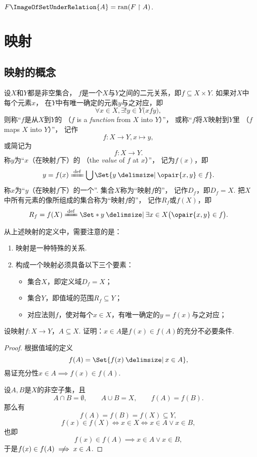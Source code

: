 \begin{theorem}
\(F\ImageOfSetUnderRelation{A} = \ran(F \upharpoonright A)\).
\end{theorem}


\section{映射}
\subsection{映射的概念}
\begin{definition}
设\(X\)和\(Y\)都是非空集合，
\(f\)是一个\(X\)与\(Y\)之间的二元关系，即\(f \subseteq X \times Y\).
如果对\(X\)中每个元素\(x\)，
在\(Y\)中有唯一确定的元素\(y\)与之对应，即\[
	\forall x \in X,
	\exists! y \in Y
	\bigl( x f y \bigr),
\]
则称“\(f\)是从\(X\)到\(Y\)的%
（\(f\) is a \emph{function} from \(X\) into \(Y\)）”，
或称“\(f\)将\(X\)映射到\(Y\)里%
（\(f\) maps \(X\) into \(Y\)）”，
记作\[
	f\colon X \to Y, x \mapsto y,
\]或简记为\[
	f\colon X \to Y.
\]
称\(y\)为“\(x\)（在映射\(f\)下）的%
（the \emph{value} of \(f\) at \(x\)）”，
记为\(f(x)\)，即\[
	y = f(x)
	\defeq \bigcup\Set{ y \given \opair{x,y} \in f }.
\]
称\(x\)为“\(y\)（在映射\(f\)下）的一个”.
集合\(X\)称为“映射\(f\)的”，
记作\(D_f\)，即\(D_f = X\).
把\(X\)中所有元素的像所组成的集合称为“映射\(f\)的”，
记作\(R_f\)或\(f(X)\)，即\[
	R_f = f(X)
	\defeq \Set*{ y \given \exists x \in X \bigl( \opair{x,y} \in f \bigr) }.
\]
\end{definition}

从上述映射的定义中，需要注意的是：
\begin{enumerate}
	\item 映射是一种特殊的关系.
	\item 构成一个映射必须具备以下三个要素：\begin{itemize}
		\item 集合\(X\)，即定义域\(D_f = X\)；
		\item 集合\(Y\)，即值域的范围\(R_f \subseteq Y\)；
		\item 对应法则\(f\)，使对每个\(x \in X\)，有唯一确定的\(y=f(x)\)与之对应；
	\end{itemize}
\end{enumerate}

\begin{example}
设映射\(f\colon X \to Y\)，\(A \subseteq X\).
证明：\(x \in A\)是\(f(x) \in f(A)\)的充分不必要条件.
\begin{proof}
根据值域的定义\[
	f(A) = \Set{ f(x) \given x \in A },
\]
易证充分性\(x \in A \implies f(x) \in f(A)\).

设\(A,B\)是\(X\)的非空子集，且\[
	A \cap B = \emptyset,
	\qquad
	A \cup B = X,
	\qquad
	f(A) = f(B).
\]那么有\[
	f(A) = f(B) = f(X) \subseteq Y,
\]\[
	f(x) \in f(X) \iff x \in X \iff x \in A \lor x \in B,
\]也即\[
	f(x) \in f(A) \implies x \in A \lor x \in B,
\]
于是\(f(x) \in f(A) \notimplies x \in A\).
\end{proof}
\end{example}

